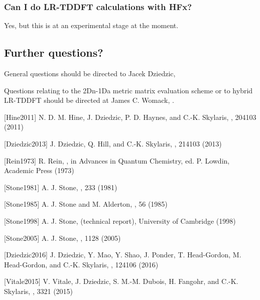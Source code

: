 \documentclass[letterpaper,10pt,english]{sphinxmanual}
\begin{document}
\subsubsection{Can I do LR-TDDFT calculations with HFx?}
\label{\detokenize{hfx:can-i-do-lr-tddft-calculations-with-hfx}}
Yes, but this is at an experimental stage at the moment.


\subsection{Further questions?}
\label{\detokenize{hfx:further-questions}}
General questions should be directed to Jacek Dziedzic,

Questions relating to the 2Dn-1Da metric matrix evaluation scheme or to
hybrid LR-TDDFT should be directed at James C. Womack,
.

{[}Hine2011{]} N. D. M. Hine, J. Dziedzic, P. D. Haynes, and C.-K. Skylaris,  , 204103 (2011)

{[}Dziedzic2013{]} J. Dziedzic, Q. Hill, and C.-K. Skylaris,  , 214103 (2013)

{[}Rein1973{]} R. Rein, , in Advances in Quantum Chemistry, ed. P. Lowdin, Academic Press (1973)

{[}Stone1981{]} A. J. Stone,  , 233 (1981)

{[}Stone1985{]} A. J. Stone and M. Alderton,  , 56 (1985)

{[}Stone1998{]} A. J. Stone,  (technical report), University of Cambridge (1998)

{[}Stone2005{]} A. J. Stone,  , 1128 (2005)

{[}Dziedzic2016{]} J. Dziedzic, Y. Mao, Y. Shao, J. Ponder, T. Head-Gordon, M. Head-Gordon, and C.-K. Skylaris,  , 124106 (2016)

{[}Vitale2015{]} V. Vitale, J. Dziedzic, S. M.-M. Dubois, H. Fangohr, and C.-K. Skylaris,  , 3321 (2015)
\end{document}
